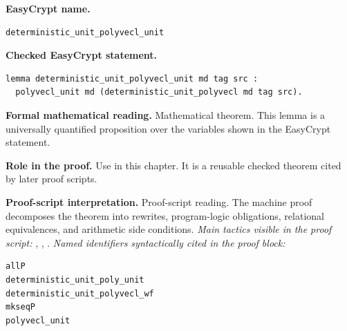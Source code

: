 \begin{formaltheorem}
\noindent\textbf{EasyCrypt name.}
\begin{lstlisting}[language=EasyCrypt,basicstyle=\ttfamily\scriptsize]
deterministic_unit_polyvecl_unit
\end{lstlisting}
\noindent\textbf{Checked EasyCrypt statement.}
\begin{lstlisting}[language=EasyCrypt,basicstyle=\ttfamily\scriptsize]
lemma deterministic_unit_polyvecl_unit md tag src :
  polyvecl_unit md (deterministic_unit_polyvecl md tag src).
\end{lstlisting}
\noindent\textbf{Formal mathematical reading.}
Mathematical theorem. This lemma is a universally quantified proposition over the variables shown in the EasyCrypt statement.

\noindent\textbf{Role in the proof.}
Use in this chapter. It is a reusable checked theorem cited by later proof scripts.

\noindent\textbf{Proof-script interpretation.}
Proof-script reading. The machine proof decomposes the theorem into rewrites, program-logic obligations, relational equivalences, and arithmetic side conditions.
\emph{Main tactics visible in the proof script:} , , .
\emph{Named identifiers syntactically cited in the proof block:}
\begin{lstlisting}[language=EasyCrypt,basicstyle=\ttfamily\scriptsize]
allP
deterministic_unit_poly_unit
deterministic_unit_polyvecl_wf
mkseqP
polyvecl_unit
\end{lstlisting}

\end{formaltheorem}

